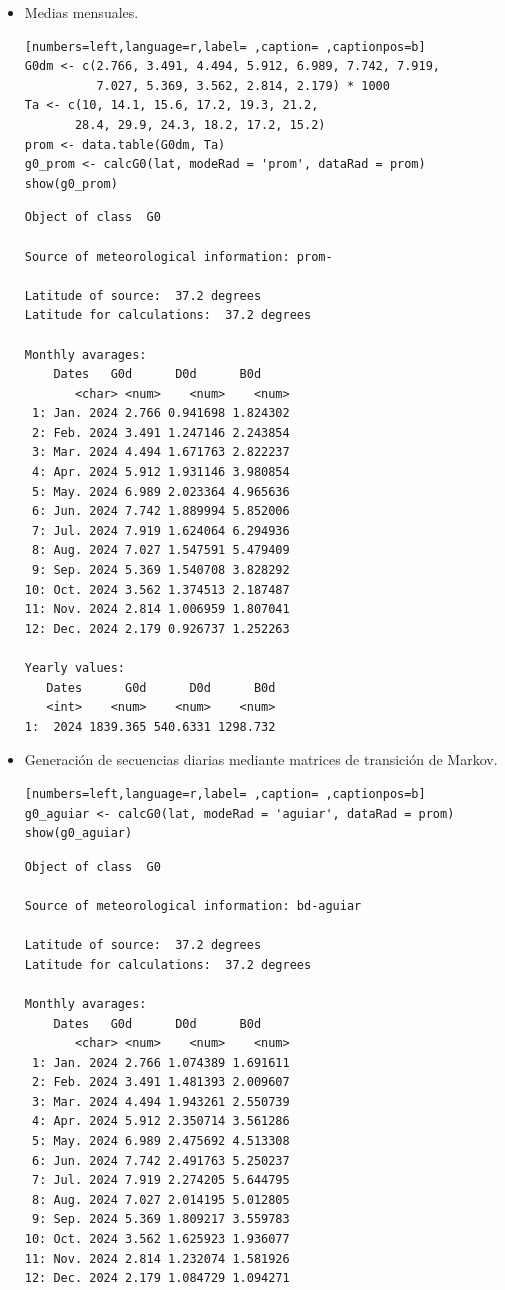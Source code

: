\begin{itemize}
\item Medias mensuales.
\begin{lstlisting}[numbers=left,language=r,label= ,caption= ,captionpos=b]
G0dm <- c(2.766, 3.491, 4.494, 5.912, 6.989, 7.742, 7.919,
          7.027, 5.369, 3.562, 2.814, 2.179) * 1000
Ta <- c(10, 14.1, 15.6, 17.2, 19.3, 21.2,
       28.4, 29.9, 24.3, 18.2, 17.2, 15.2)
prom <- data.table(G0dm, Ta) 
g0_prom <- calcG0(lat, modeRad = 'prom', dataRad = prom)
show(g0_prom)
\end{lstlisting}

\begin{verbatim}
Object of class  G0 

Source of meteorological information: prom- 

Latitude of source:  37.2 degrees
Latitude for calculations:  37.2 degrees

Monthly avarages:
	Dates   G0d      D0d      B0d
       <char> <num>    <num>    <num>
 1: Jan. 2024 2.766 0.941698 1.824302
 2: Feb. 2024 3.491 1.247146 2.243854
 3: Mar. 2024 4.494 1.671763 2.822237
 4: Apr. 2024 5.912 1.931146 3.980854
 5: May. 2024 6.989 2.023364 4.965636
 6: Jun. 2024 7.742 1.889994 5.852006
 7: Jul. 2024 7.919 1.624064 6.294936
 8: Aug. 2024 7.027 1.547591 5.479409
 9: Sep. 2024 5.369 1.540708 3.828292
10: Oct. 2024 3.562 1.374513 2.187487
11: Nov. 2024 2.814 1.006959 1.807041
12: Dec. 2024 2.179 0.926737 1.252263

Yearly values:
   Dates      G0d      D0d      B0d
   <int>    <num>    <num>    <num>
1:  2024 1839.365 540.6331 1298.732
\end{verbatim}

\item Generación de secuencias diarias mediante matrices de transición de Markov.
\begin{lstlisting}[numbers=left,language=r,label= ,caption= ,captionpos=b]
g0_aguiar <- calcG0(lat, modeRad = 'aguiar', dataRad = prom)
show(g0_aguiar)
\end{lstlisting}

\begin{verbatim}
Object of class  G0 

Source of meteorological information: bd-aguiar 

Latitude of source:  37.2 degrees
Latitude for calculations:  37.2 degrees

Monthly avarages:
	Dates   G0d      D0d      B0d
       <char> <num>    <num>    <num>
 1: Jan. 2024 2.766 1.074389 1.691611
 2: Feb. 2024 3.491 1.481393 2.009607
 3: Mar. 2024 4.494 1.943261 2.550739
 4: Apr. 2024 5.912 2.350714 3.561286
 5: May. 2024 6.989 2.475692 4.513308
 6: Jun. 2024 7.742 2.491763 5.250237
 7: Jul. 2024 7.919 2.274205 5.644795
 8: Aug. 2024 7.027 2.014195 5.012805
 9: Sep. 2024 5.369 1.809217 3.559783
10: Oct. 2024 3.562 1.625923 1.936077
11: Nov. 2024 2.814 1.232074 1.581926
12: Dec. 2024 2.179 1.084729 1.094271


\end{verbatim}
\end{itemize}
